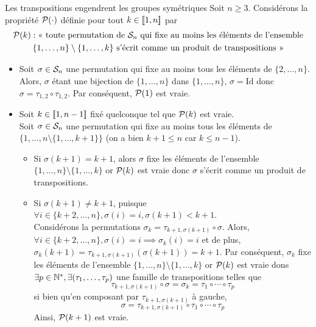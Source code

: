 \documentclass{article}
\begin{document}
\begin{question_kholle}{Les transpositions engendrent les groupes symétriques}
	Soit $n\geq 3$. Considérons la propriété $\mathcal P(\cdot)$ définie pour tout $k\in[\![ 1,n ]\!]$ par
	\begin{multline*}
		\mathcal P(k): \text{<<~toute permutation de $\mathcal{S}_{n}$ qui fixe au moins les éléments de l’ensemble} \\ \text{$\{1,\dots, n\}\setminus \{1,\dots, k\}$ s’écrit comme un produit de transpositions~>>}
	\end{multline*}
	\begin{itemize}
		\item Soit $\sigma\in\mathcal{S}_{n}$ une permutation qui fixe au moins tous les éléments de $\{2,\dots, n\}$. Alors, $\sigma$ étant une bijection de $\{1,\dots,n\}$ dans $\{1,\dots, n\}$, $\sigma=\mathrm{Id}$ donc $\sigma=\tau_{1,2}\circ \tau_{1,2}$. Par conséquent, $\mathcal P(1)$ est vraie.
		\item Soit $k\in[\![ 1,n-1 ]\!]$ fixé quelconque tel que $\mathcal P(k)$ est vraie.\\
		      Soit $\sigma\in\mathcal{S}_{n}$ une permutation qui fixe au moins tous les éléments de $\{1,\dots,n\setminus \{1,\dots,k+1\}\}$ (on a bien $k+1\leq n$ car $k\leq n-1$).
		      \begin{itemize}
			      \item Si $\sigma(k+1)=k+1$, alors $\sigma$ fixe les éléments de l’ensemble $\{1,\dots,n\}\setminus \{1,\dots,k\}$ or $\mathcal P(k)$ est vraie donc $\sigma$ s’écrit comme un produit de transpositions.
			      \item Si $\sigma(k+1)\neq k+1$, puisque $\forall i\in\{k+2,\dots, n\}, \sigma(i)=i, \sigma(k+1)<k+1$.\\
			            Considérons la permutations $\sigma_{k} = \tau_{k+1,\sigma(k+1)}\circ \sigma$. Alors, $\forall i\in\{k+2,\dots,n\},\sigma(i) = i \implies \sigma_{k}(i)=i$ et de plus, $\sigma_{k}(k+1)=\tau_{k+1,\sigma(k+1)}(\sigma(k+1)) = k+1$. Par conséquent, $\sigma_{k}$ fixe les éléments de l’ensemble $\{1,\dots,n\}\setminus\{1,\dots,k\}$ or $\mathcal P(k)$ est vraie dons $\exists p\in\mathbb N^{*}, \exists (\tau_{1},\dots, \tau_{p})$ une famille de transpositions telles que
			            \[
				            \tau_{k+1,\sigma(k+1)}\circ \sigma = \sigma_{k} = \tau_{1}\circ \cdots \circ \tau_{p}
			            \]
			            si bien qu’en composant par $\tau_{k+1,\sigma(k+1)}$ à gauche,
			            \[
				            \sigma=\tau_{k+1,\sigma(k+1)}\circ \tau_{1}\circ\cdots\circ \tau_{p}
			            \]
			            Ainsi, $\mathcal P(k+1)$ est vraie.
		      \end{itemize}
	\end{itemize}


\end{question_kholle}
\end{document}
